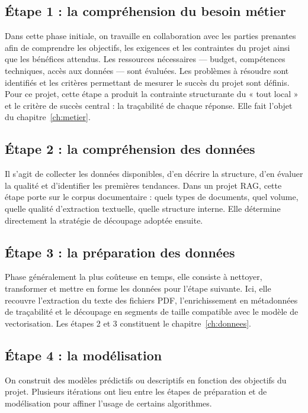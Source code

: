 \subsection*{Étape 1 : la compréhension du besoin métier}

Dans cette phase initiale, on travaille en collaboration avec les parties
prenantes afin de comprendre les objectifs, les exigences et les contraintes du
projet ainsi que les bénéfices attendus. Les ressources nécessaires --- budget,
compétences techniques, accès aux données --- sont évaluées. Les problèmes à
résoudre sont identifiés et les critères permettant de mesurer le succès du
projet sont définis. Pour ce projet, cette étape a produit la contrainte
structurante du « tout local » et le critère de succès central : la traçabilité
de chaque réponse. Elle fait l'objet du chapitre~\ref{ch:metier}.

\subsection*{Étape 2 : la compréhension des données}

Il s'agit de collecter les données disponibles, d'en décrire la structure, d'en
évaluer la qualité et d'identifier les premières tendances. Dans un projet RAG,
cette étape porte sur le corpus documentaire : quels types de documents, quel
volume, quelle qualité d'extraction textuelle, quelle structure interne. Elle
détermine directement la stratégie de découpage adoptée ensuite.

\subsection*{Étape 3 : la préparation des données}

Phase généralement la plus coûteuse en temps, elle consiste à nettoyer,
transformer et mettre en forme les données pour l'étape suivante. Ici, elle
recouvre l'extraction du texte des fichiers PDF, l'enrichissement en métadonnées
de traçabilité et le découpage en segments de taille compatible avec le modèle
de vectorisation. Les étapes 2 et 3 constituent le chapitre~\ref{ch:donnees}.

\subsection*{Étape 4 : la modélisation}

On construit des modèles prédictifs ou descriptifs en fonction des objectifs du
projet. Plusieurs itérations ont lieu entre les étapes de préparation et de
modélisation pour affiner l'usage de certains algorithmes.

